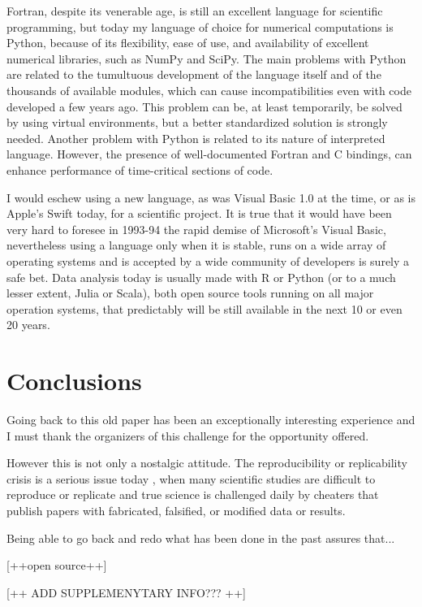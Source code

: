 Fortran, despite its venerable age, is still an excellent language for scientific programming, but today my language of choice for numerical computations is Python, because of its flexibility, ease of use, and  availability of excellent numerical libraries, such as NumPy and SciPy.
The main problems with Python are related to the tumultuous development of the language itself and of the thousands of available modules, which can cause incompatibilities even with code developed a few years ago. This problem can be, at least temporarily, be solved by using virtual environments, but a better standardized solution is strongly needed.
Another problem with Python is related to its nature of interpreted language. However, the presence of well-documented Fortran and C bindings, can enhance performance of time-critical sections of code.

I would eschew using a new language, as was Visual Basic 1.0 at the time, or as is Apple's Swift today, for a scientific project. 
It is true that it would have been very hard to foresee in 1993-94 the rapid demise of Microsoft's Visual Basic, nevertheless using a language only when it is stable, runs on a wide array of operating systems and is accepted by a wide community of developers is surely a safe bet.
Data analysis today is usually made with R or Python (or to a much lesser extent, Julia or Scala), both open source tools running on all major operation systems, that predictably will be still available in the next 10 or even 20 years.

 

\section{Conclusions}

Going back to this old paper has been an exceptionally interesting experience and I must thank the organizers of this challenge for the opportunity offered.

However this is not only a nostalgic attitude. The reproducibility or replicability crisis is a serious issue today \cite{Miyakawa:2020}, when many scientific studies are difficult to reproduce or replicate and  true science is challenged daily by cheaters that publish papers with fabricated, falsified, or modified data or results.

Being able to go back and redo what has been done in the past assures that...

[++open source++]

[++ ADD SUPPLEMENYTARY INFO??? ++]



